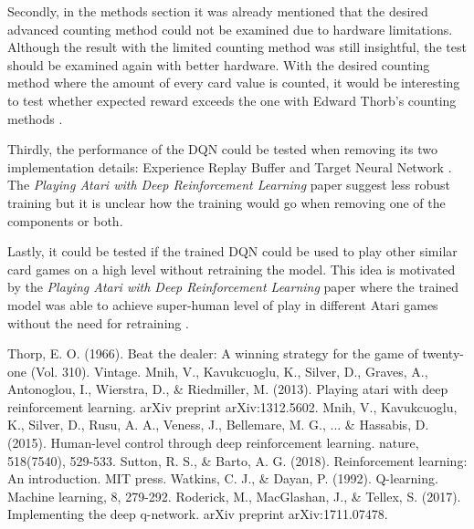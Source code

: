 \documentclass[conference]{IEEEtran}
\begin{document}
Secondly, in the methods section it was already mentioned that the desired advanced counting method could not be examined due to hardware limitations. 
Although the result with the limited counting method was still insightful, the test should be examined again with better hardware.
With the desired counting method where the amount of every card value is counted, it would be interesting to test whether expected reward exceeds the one with Edward Thorb's counting methods \cite{b1}.

Thirdly, the performance of the DQN could be tested when removing its two implementation details: Experience Replay Buffer and Target Neural Network \cite{b2}.
The \textit{Playing Atari with Deep Reinforcement Learning} paper \cite{b2} suggest less robust training but it is unclear how the training would go when removing one of the components or both. 

Lastly, it could be tested if the trained DQN could be used to play other similar card games on a high level without retraining the model. 
This idea is motivated by the \textit{Playing Atari with Deep Reinforcement Learning} paper where the trained model was able to achieve super-human level of play in different Atari games without the need for retraining \cite{b2}. 


\begin{thebibliography}{00}
 Thorp, E. O. (1966). Beat the dealer: A winning strategy for the game of twenty-one (Vol. 310). Vintage.
 Mnih, V., Kavukcuoglu, K., Silver, D., Graves, A., Antonoglou, I., Wierstra, D., \& Riedmiller, M. (2013). Playing atari with deep reinforcement learning. arXiv preprint arXiv:1312.5602.
 Mnih, V., Kavukcuoglu, K., Silver, D., Rusu, A. A., Veness, J., Bellemare, M. G., ... \& Hassabis, D. (2015). Human-level control through deep reinforcement learning. nature, 518(7540), 529-533.
 Sutton, R. S., \& Barto, A. G. (2018). Reinforcement learning: An introduction. MIT press.
 Watkins, C. J., \& Dayan, P. (1992). Q-learning. Machine learning, 8, 279-292.
 Roderick, M., MacGlashan, J., \& Tellex, S. (2017). Implementing the deep q-network. arXiv preprint arXiv:1711.07478.
\end{thebibliography}
\end{document}
